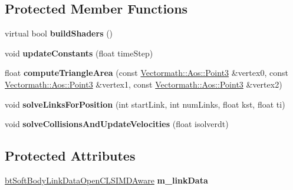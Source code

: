 \subsection*{Protected Member Functions}
\begin{DoxyCompactItemize}
\item 
\hypertarget{classbt_open_c_l_soft_body_solver_s_i_m_d_aware_aa8ee9bc875c146d057dbec97a265f28d}{virtual bool {\bfseries build\+Shaders} ()}\label{classbt_open_c_l_soft_body_solver_s_i_m_d_aware_aa8ee9bc875c146d057dbec97a265f28d}

\item 
\hypertarget{classbt_open_c_l_soft_body_solver_s_i_m_d_aware_ac6d30fe05474179503e358206b324f4a}{void {\bfseries update\+Constants} (float time\+Step)}\label{classbt_open_c_l_soft_body_solver_s_i_m_d_aware_ac6d30fe05474179503e358206b324f4a}

\item 
\hypertarget{classbt_open_c_l_soft_body_solver_s_i_m_d_aware_ab79b13b9647a6c39ec688a6ed64f80b3}{float {\bfseries compute\+Triangle\+Area} (const \hyperlink{class_vectormath_1_1_aos_1_1_point3}{Vectormath\+::\+Aos\+::\+Point3} \&vertex0, const \hyperlink{class_vectormath_1_1_aos_1_1_point3}{Vectormath\+::\+Aos\+::\+Point3} \&vertex1, const \hyperlink{class_vectormath_1_1_aos_1_1_point3}{Vectormath\+::\+Aos\+::\+Point3} \&vertex2)}\label{classbt_open_c_l_soft_body_solver_s_i_m_d_aware_ab79b13b9647a6c39ec688a6ed64f80b3}

\item 
\hypertarget{classbt_open_c_l_soft_body_solver_s_i_m_d_aware_a08067324c12be8a65f8e04e222e2a0c3}{void {\bfseries solve\+Links\+For\+Position} (int start\+Link, int num\+Links, float kst, float ti)}\label{classbt_open_c_l_soft_body_solver_s_i_m_d_aware_a08067324c12be8a65f8e04e222e2a0c3}

\item 
\hypertarget{classbt_open_c_l_soft_body_solver_s_i_m_d_aware_a8dbb149d1a9e3e836b63ab5682bf1a3c}{void {\bfseries solve\+Collisions\+And\+Update\+Velocities} (float isolverdt)}\label{classbt_open_c_l_soft_body_solver_s_i_m_d_aware_a8dbb149d1a9e3e836b63ab5682bf1a3c}

\end{DoxyCompactItemize}
\subsection*{Protected Attributes}
\begin{DoxyCompactItemize}
\item 
\hypertarget{classbt_open_c_l_soft_body_solver_s_i_m_d_aware_af0314c7ba022a0651bbb79d2cfc5e3a7}{\hyperlink{classbt_soft_body_link_data_open_c_l_s_i_m_d_aware}{bt\+Soft\+Body\+Link\+Data\+Open\+C\+L\+S\+I\+M\+D\+Aware} {\bfseries m\+\_\+link\+Data}}\label{classbt_open_c_l_soft_body_solver_s_i_m_d_aware_af0314c7ba022a0651bbb79d2cfc5e3a7}

\end{DoxyCompactItemize}
